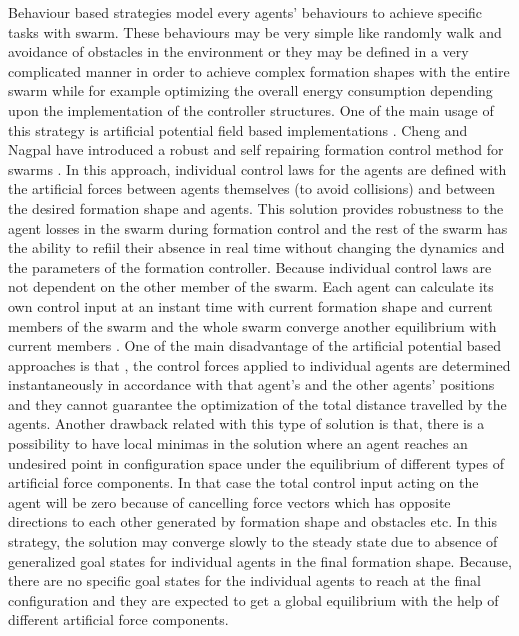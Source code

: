 \documentclass[letterpaper, 10 pt, conference]{ieeeconf}  %
\begin{document}
Behaviour based strategies model every agents' behaviours to achieve specific tasks with swarm. These behaviours may be very simple like randomly walk and avoidance of  obstacles in the environment or they may be defined in a very complicated manner in order to achieve complex formation shapes with the entire swarm while for example optimizing the overall energy consumption depending  upon the implementation of the controller structures.  One of the main usage of this strategy is artificial potential field based implementations . Cheng and Nagpal have introduced a robust and self repairing formation control method for swarms \cite{24}. In this approach, individual control laws for the agents are defined with the artificial forces between agents themselves (to avoid collisions) and between the desired formation shape and agents. This solution provides robustness to the agent losses in the swarm during formation control and the rest of the swarm has the ability to refiil their absence in real time without changing the dynamics and the parameters of the formation controller. Because individual control laws are not dependent on the other member of the swarm. Each agent can calculate its own control input at an instant time with current formation shape and current members of the swarm and the whole swarm converge another equilibrium with current members \cite{24}. One of the main disadvantage of the artificial potential based approaches is that , the control forces applied to individual agents are determined instantaneously in accordance with that agent's and the other agents' positions and they cannot guarantee the optimization of the total distance travelled by the agents. Another drawback related with this type of solution is that, there is a possibility to have local minimas in the solution where an agent reaches an undesired point in configuration space under the equilibrium of different types of artificial force components. In that case the total control input acting on the agent will be zero because of cancelling force vectors which has opposite directions to each other generated by formation shape and obstacles etc. In this strategy, the solution may converge slowly to the steady state due to absence of generalized goal states for individual agents in the final formation shape. Because, there are no specific goal states for the individual agents to reach at the final configuration and they are expected to get a global equilibrium with the help of different artificial force components. 
\end{document}
